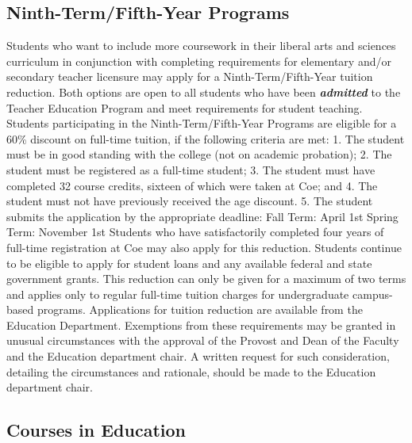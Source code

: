 \documentclass[
  letterpaper,
]{scrbook}
\begin{document}
\subsection{Ninth-Term/Fifth-Year
Programs}\label{ninth-termfifth-year-programs}

Students who want to include more coursework in their liberal arts and
sciences curriculum in conjunction with completing requirements for
elementary and/or secondary teacher licensure may apply for a
Ninth-Term/Fifth-Year tuition reduction. Both options are open to all
students who have been \textbf{\emph{admitted}} to the Teacher Education
Program and meet requirements for student teaching. Students
participating in the Ninth-Term/Fifth-Year Programs are eligible for a
60\% discount on full-time tuition, if the following criteria are met:
1. The student must be in good standing with the college (not on
academic probation); 2. The student must be registered as a full-time
student; 3. The student must have completed 32 course credits, sixteen
of which were taken at Coe; and 4. The student must not have previously
received the age discount. 5. The student submits the application by the
appropriate deadline: Fall Term: April 1st Spring Term: November 1st
Students who have satisfactorily completed four years of full-time
registration at Coe may also apply for this reduction. Students continue
to be eligible to apply for student loans and any available federal and
state government grants. This reduction can only be given for a maximum
of two terms and applies only to regular full-time tuition charges for
undergraduate campus-based programs. Applications for tuition reduction
are available from the Education Department. Exemptions from these
requirements may be granted in unusual circumstances with the approval
of the Provost and Dean of the Faculty and the Education department
chair. A written request for such consideration, detailing the
circumstances and rationale, should be made to the Education department
chair.

\subsection{Courses in Education}\label{courses-in-education}
\end{document}
